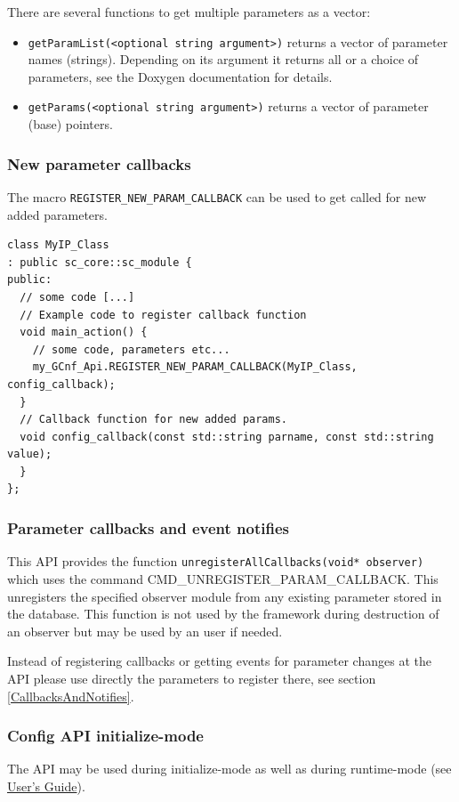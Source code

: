 There are several functions to get multiple parameters as a vector:\vspace{-2ex}
\begin{itemize}
  \item \lstinline|getParamList(<optional string argument>)| returns a vector of parameter names (strings). Depending on its argument it returns all or a choice of parameters, see the Doxygen documentation for details.
  \item \lstinline|getParams(<optional string argument>)| returns a vector of parameter (base) pointers.
\end{itemize}

\subsubsection{New parameter callbacks}

The macro \lstinline|REGISTER_NEW_PARAM_CALLBACK| can be used to get called for new added parameters.

\begin{lstlisting}
class MyIP_Class
: public sc_core::sc_module {
public:
  // some code [...]
  // Example code to register callback function
  void main_action() {
    // some code, parameters etc...
    my_GCnf_Api.REGISTER_NEW_PARAM_CALLBACK(MyIP_Class, config_callback);
  }
  // Callback function for new added params.
  void config_callback(const std::string parname, const std::string value);
  }
};
\end{lstlisting}

\subsubsection{Parameter callbacks and event notifies}

This API provides the function \lstinline|unregisterAllCallbacks(void* observer)| which uses the \GreenControl command CMD\_UNREGISTER\_PARAM\_CALLBACK. This unregisters the specified observer module from any existing parameter stored in the database. This function is not used by the framework during destruction of an observer but may be used by an user if needed.

 Instead of registering callbacks or getting events for parameter changes at the \GreenConfig API please use directly the parameters to register there, see section \ref{CallbacksAndNotifies}.

\subsubsection{Config API initialize-mode}
\label{ConfigAPIinitializeMode}
The \GreenConfig API may be used during initialize-mode as well as during runtime-mode (see \hyperlink{GCUsersGuide}{\GreenControl User's Guide}).


